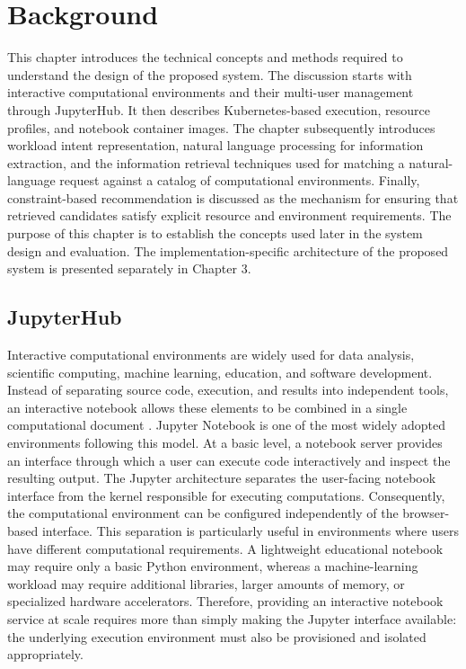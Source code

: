 \chapter{Background}

This chapter introduces the technical concepts and methods required to understand the design of the proposed system. The discussion starts with interactive computational environments and their multi-user management through JupyterHub. It then describes Kubernetes-based execution, resource profiles, and notebook container images. The chapter subsequently introduces workload intent representation, natural language processing for information extraction, and the information retrieval techniques used for matching a natural-language request against a catalog of computational environments. Finally, constraint-based recommendation is discussed as the mechanism for ensuring that retrieved candidates satisfy explicit resource and environment requirements. The purpose of this chapter is to establish the concepts used later in the system design and evaluation. The implementation-specific architecture of the proposed system is presented separately in Chapter 3.

\section{JupyterHub}

Interactive computational environments are widely used for data analysis, scientific computing, machine learning, education, and software development. Instead of separating source code, execution, and results into independent tools, an interactive notebook allows these elements to be combined in a single computational document \cite{kluyver}. Jupyter Notebook is one of the most widely adopted environments following this model. At a basic level, a notebook server provides an interface through which a user can execute code interactively and inspect the resulting output. The Jupyter architecture separates the user-facing notebook interface from the kernel responsible for executing computations. Consequently, the computational environment can be configured independently of the browser-based interface. This separation is particularly useful in environments where users have different computational requirements. A lightweight educational notebook may require only a basic Python environment, whereas a machine-learning workload may require additional libraries, larger amounts of memory, or specialized hardware accelerators. Therefore, providing an interactive notebook service at scale requires more than simply making the Jupyter interface available: the underlying execution environment must also be provisioned and isolated appropriately.

